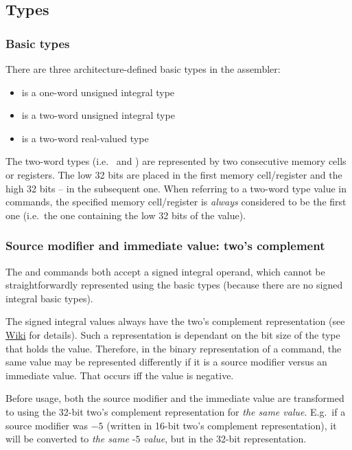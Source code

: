 \subsection{Types}

\subsubsection{Basic types}

\vspace{-0.2cm}
There are three architecture-defined basic types in the  assembler:

\begin{itemize}
    \item {} is a one-word unsigned integral type
    \item {} is a two-word unsigned integral type
    \item {} is a two-word real-valued type
\end{itemize}

\hypertarget{types:two_words_storage}{}
The two-word types (i.e.\  and ) are represented by two
consecutive memory cells or registers.
The low 32 bits are placed in the first memory cell/register and the high
32 bits -- in the subsequent one.
When referring to a two-word type value in commands, the specified
memory cell/register is \textit{always} considered to be the first one
(i.e.\ the one containing the low 32 bits of the value).

\hypertarget{types:twos_complement}{
    \subsubsection{Source modifier and immediate value: two's complement}
}

The  and  commands both accept a signed integral operand, which
cannot be straightforwardly represented using the basic types (because there
are no signed integral basic types).

The signed integral values always have the two's complement representation
(see \href{https://en.wikipedia.org/wiki/Two\%27s_complement}{Wiki} for details).
Such a representation is dependant on the bit size of the type that holds the
value.
Therefore, in the binary representation of a command, the same value may
be represented differently if it is a source modifier versus an immediate value.
That occurs iff the value is negative.

Before usage, both the source modifier and the immediate value are transformed
to  using the 32-bit two's complement representation for
\textit{the same value}.
E.g.\ if a source modifier was $-5$ (written in 16-bit two's complement
representation), it will be converted to \textit{the same} $\textit{-5}$
\textit{value}, but in the 32-bit representation.

